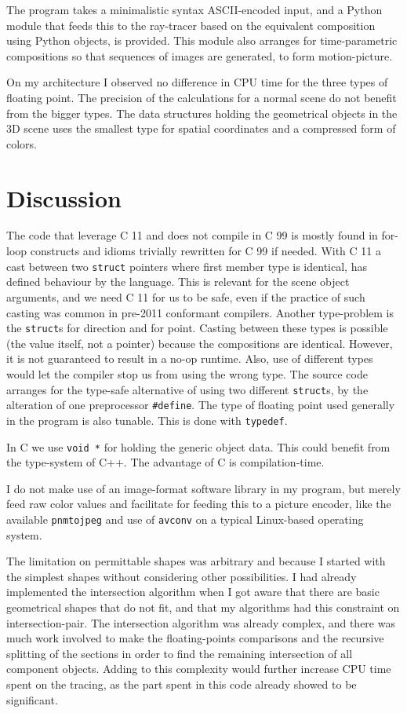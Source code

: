 \documentclass{article}
\begin{document}
The program takes a minimalistic syntax ASCII-encoded input,
and a Python module that feeds this to the ray-tracer
based on the equivalent composition using Python objects,
is provided.  This module also arranges for time-parametric
compositions so that sequences of images are generated,
to form motion-picture.

On my architecture I observed no difference in CPU time for
the three types of floating point.  The precision of the
calculations for a normal scene do not benefit from
the bigger types.  The data structures holding the geometrical
objects in the 3D scene uses the smallest type for spatial
coordinates and a compressed form of colors.

\section{Discussion}

The code that leverage C 11 and does not compile in C 99
is mostly found in for-loop constructs and idioms trivially
rewritten for C 99 if needed.  With C 11 a cast between
two \verb|struct| pointers where first member type is identical,
has defined behaviour by the language.
This is relevant for the scene object arguments, and we
need C 11 for us to be safe, even if the
practice of such casting was common in pre-2011 conformant
compilers.  Another type-problem is the \verb|struct|s for
direction and for point.  Casting between these types is
possible (the value itself, not a pointer)
because the compositions are identical.  However, it is not guaranteed
to result in a no-op runtime.  Also, use of different types
would let the compiler stop us from using the wrong type.
The source code arranges for the type-safe alternative of
using two different \verb|struct|s, by the alteration of one
preprocessor \verb|#define|.
The type of floating point used generally in the program is
also tunable.  This is done with \verb|typedef|.

In C we use \verb|void *| for holding the generic object data.
This could benefit from the type-system of C++.
The advantage of C is compilation-time.

I do not make use of an image-format software library
in my program, but merely feed raw color values and
facilitate for feeding this to a picture encoder, like the
available \texttt{pnmtojpeg} and use of \texttt{avconv}
on a typical Linux-based operating system.

The limitation on permittable shapes was arbitrary and because
I started with the simplest shapes without considering
other possibilities.  I had already implemented the
intersection algorithm when I got aware that there are
basic geometrical shapes that do not fit, and that my
algorithms had this constraint on intersection-pair.
The intersection algorithm was already complex,
and there was much work involved to make the floating-points
comparisons and the recursive splitting of the sections
in order to find the remaining intersection of all
component objects.  Adding to this complexity would
further increase CPU time spent on the tracing,
as the part spent in this code already showed to be
significant.
\end{document}
